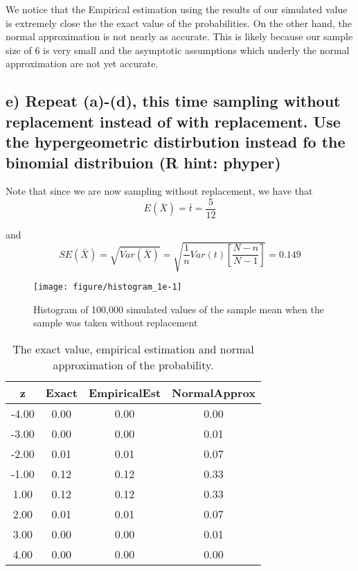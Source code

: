 \documentclass[11pt]{article}\usepackage[]{graphicx}\usepackage[]{color}
\makeatletter
\def\maxwidth{ %
  \ifdim\Gin@nat@width>\linewidth
    \linewidth
  \else
    \Gin@nat@width
  \fi
}
\newenvironment{knitrout}{}{} %
\makeatother
\begin{document}
\noindent We notice that the Empirical estimation using the results of our simulated value is extremely close the the exact value of the probabilities. On the other hand, the normal approximation is not nearly as accurate. This is likely because our sample size of 6 is very small and the asymptotic assumptions which underly the normal approximation are not yet accurate.



\subsection*{e) Repeat (a)-(d), this time sampling without replacement instead of with replacement. Use the hypergeometric distirbution instead fo the binomial distribuion (R hint: phyper)}


\noindent Note that since we are now sampling without replacement, we have that
$$E(\bar{X}) = \bar{t} = \frac{5}{12}$$

\noindent and
$$SE(\bar{X}) = \sqrt{Var(\bar{X})} = \sqrt{\frac{1}{n} Var(t) \left[\frac{N - n}{N - 1}\right]} = 0.149$$


\begin{knitrout}
\color{fgcolor}\begin{figure}[H]

{\centering \texttt{[image: figure/histogram\_1e-1]} 

}

\caption[Histogram of 100,000 simulated values of the sample mean when the sample was taken without replacement]{Histogram of 100,000 simulated values of the sample mean when the sample was taken without replacement\label{fig:histogram_1e}}
\end{figure}


\end{knitrout}

\begin{table}[H]
\centering
\begin{tabular}{|c|ccc|}
  \hline
z & Exact & EmpiricalEst & NormalApprox \\ 
  \hline
-4.00 & 0.00 & 0.00 & 0.00 \\ 
  -3.00 & 0.00 & 0.00 & 0.01 \\ 
  -2.00 & 0.01 & 0.01 & 0.07 \\ 
  -1.00 & 0.12 & 0.12 & 0.33 \\ 
  1.00 & 0.12 & 0.12 & 0.33 \\ 
  2.00 & 0.01 & 0.01 & 0.07 \\ 
  3.00 & 0.00 & 0.00 & 0.01 \\ 
  4.00 & 0.00 & 0.00 & 0.00 \\ 
   \hline
\end{tabular}
\caption{The exact value, empirical estimation and normal approximation of the probability.} 
\end{table}
\end{document}
